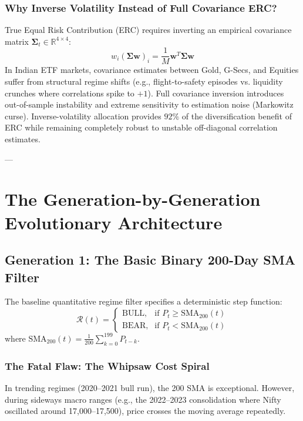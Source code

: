 \documentclass[11pt,a4paper]{article}
\begin{document}
\subsubsection{Why Inverse Volatility Instead of Full Covariance ERC?}
True Equal Risk Contribution (ERC) requires inverting an empirical covariance matrix $\boldsymbol{\Sigma}_t \in \mathbb{R}^{4 \times 4}$:
\begin{equation}
w_i (\boldsymbol{\Sigma} \mathbf{w})_i = \frac{1}{M} \mathbf{w}^T \boldsymbol{\Sigma} \mathbf{w}
\end{equation}
In Indian ETF markets, covariance estimates between Gold, G-Secs, and Equities suffer from structural regime shifts (e.g., flight-to-safety episodes vs. liquidity crunches where correlations spike to $+1$). Full covariance inversion introduces out-of-sample instability and extreme sensitivity to estimation noise (Markowitz curse). Inverse-volatility allocation provides $92\%$ of the diversification benefit of ERC while remaining completely robust to unstable off-diagonal correlation estimates.

---

\section{The Generation-by-Generation Evolutionary Architecture}

\subsection{Generation 1: The Basic Binary 200-Day SMA Filter}
The baseline quantitative regime filter specifies a deterministic step function:
\begin{equation}
\mathcal{R}(t) = 
\begin{cases}
\text{BULL}, & \text{if } P_t \ge \text{SMA}_{200}(t) \\
\text{BEAR}, & \text{if } P_t < \text{SMA}_{200}(t)
\end{cases}
\end{equation}
where $\text{SMA}_{200}(t) = \frac{1}{200}\sum_{k=0}^{199} P_{t-k}$.

\subsubsection{The Fatal Flaw: The Whipsaw Cost Spiral}
In trending regimes (2020--2021 bull run), the 200 SMA is exceptional. However, during sideways macro ranges (e.g., the 2022--2023 consolidation where Nifty oscillated around 17,000--17,500), price crosses the moving average repeatedly. 
\end{document}
